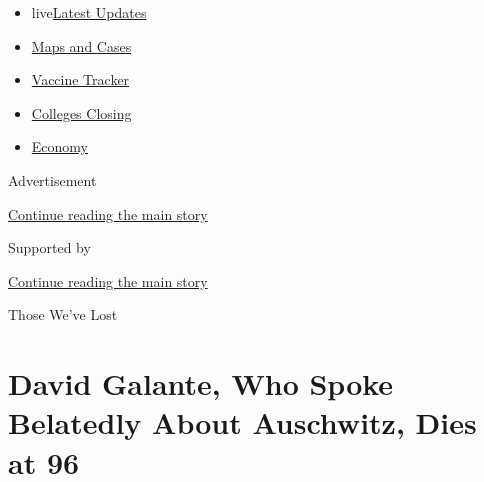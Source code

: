\begin{itemize}
\tightlist
\item
  live\href{https://www.nytimes3xbfgragh.onion/2020/08/21/world/covid-19-coronavirus.html?name=promo-coronavirus-obits\&region=TOP_BANNER\&variant=undefined\&block=storyline_menu_recirc\&action=click\&pgtype=Article\&impression_id=fdb215b1-e3af-11ea-b09c-a17bea779444}{Latest
  Updates}
\item
  \href{https://www.nytimes3xbfgragh.onion/interactive/2020/us/coronavirus-us-cases.html?name=promo-coronavirus-obits\&region=TOP_BANNER\&variant=undefined\&block=storyline_menu_recirc\&action=click\&pgtype=Article\&impression_id=fdb215b2-e3af-11ea-b09c-a17bea779444}{Maps
  and Cases}
\item
  \href{https://www.nytimes3xbfgragh.onion/interactive/2020/science/coronavirus-vaccine-tracker.html?name=promo-coronavirus-obits\&region=TOP_BANNER\&variant=undefined\&block=storyline_menu_recirc\&action=click\&pgtype=Article\&impression_id=fdb215b3-e3af-11ea-b09c-a17bea779444}{Vaccine
  Tracker}
\item
  \href{https://www.nytimes3xbfgragh.onion/2020/08/19/us/colleges-closing-covid.html?name=promo-coronavirus-obits\&region=TOP_BANNER\&variant=undefined\&block=storyline_menu_recirc\&action=click\&pgtype=Article\&impression_id=fdb215b4-e3af-11ea-b09c-a17bea779444}{Colleges
  Closing}
\item
  \href{https://www.nytimes3xbfgragh.onion/live/2020/08/21/business/stock-market-today-coronavirus?name=promo-coronavirus-obits\&region=TOP_BANNER\&variant=undefined\&block=storyline_menu_recirc\&action=click\&pgtype=Article\&impression_id=fdb23cc0-e3af-11ea-b09c-a17bea779444}{Economy}
\end{itemize}

Advertisement

\protect\hyperlink{after-top}{Continue reading the main story}

Supported by

\protect\hyperlink{after-sponsor}{Continue reading the main story}

Those We've Lost

\hypertarget{david-galante-who-spoke-belatedly-about-auschwitz-dies-at-96}{%
\section{David Galante, Who Spoke Belatedly About Auschwitz, Dies at
96}\label{david-galante-who-spoke-belatedly-about-auschwitz-dies-at-96}}

